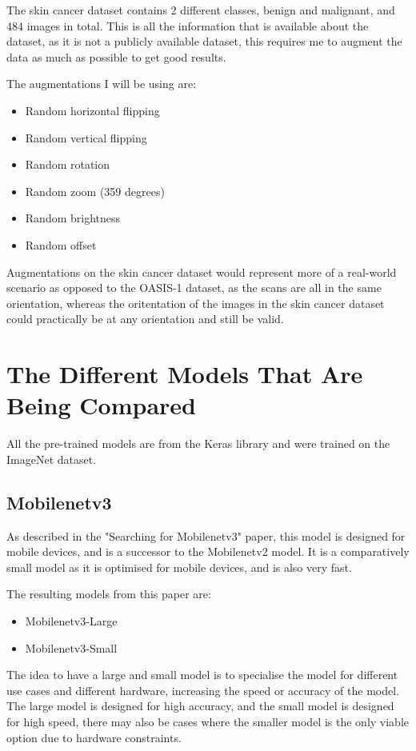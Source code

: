 \documentclass[]{final_report}
\begin{document}
The skin cancer dataset contains 2 different classes, benign and malignant, and 484 images in total.
This is all the information that is available about the dataset, as it is not a publicly available dataset, this requires me to augment the data as much as possible to get good results.

The augmentations I will be using are:
\begin{itemize}
  \item Random horizontal flipping
  \item Random vertical flipping
  \item Random rotation
  \item Random zoom (359 degrees)
  \item Random brightness
  \item Random offset
\end{itemize}

Augmentations on the skin cancer dataset would represent more of a real-world scenario as opposed to the OASIS-1 dataset, as the scans are all in the same orientation, whereas the oritentation of the images in the skin cancer dataset could practically be at any orientation and still be valid.

\chapter{The Different Models That Are Being Compared}

All the pre-trained models are from the Keras library\cite{Keras} and were trained on the ImageNet dataset\cite{ImageNet}.

\section{Mobilenetv3}

As described in the "Searching for Mobilenetv3" paper\cite{DBLP:journals/corr/abs-1905-02244}, this model is designed for mobile devices, and is a successor to the Mobilenetv2 model.
It is a comparatively small model as it is optimised for mobile devices, and is also very fast.

The resulting models from this paper are:
\begin{itemize}
  \item Mobilenetv3-Large
  \item Mobilenetv3-Small
\end{itemize}

The idea to have a large and small model is to specialise the model for different use cases and different hardware, increasing the speed or accuracy of the model.
The large model is designed for high accuracy, and the small model is designed for high speed, there may also be cases where the smaller model is the only viable option due to hardware constraints.
\end{document}
